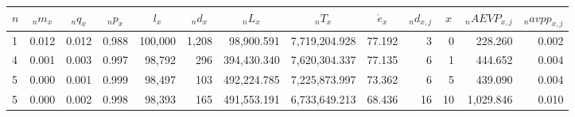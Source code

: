 \documentclass[fontsize=11pt]{article}
\begin{document}
\begin{landscape}
\begin{table}[]
\centering
\begin{tabular}{lrrrrrrrrrr|r|r|}
\hline
\multicolumn{1}{|l|}{$n$} & \multicolumn{1}{c|}{${}_nm_x$}   & \multicolumn{1}{c|}{${}_nq_x$}   & \multicolumn{1}{c|}{${}_{n}p_x$}   & \multicolumn{1}{c|}{$l_x$}      & \multicolumn{1}{c|}{${}_nd_x$}    & \multicolumn{1}{c|}{${}_nL_x$}         & \multicolumn{1}{c|}{${}_nT_x$}           & \multicolumn{1}{c|}{$\mathring{e}_x$}     & \multicolumn{1}{c|}{${}_nd_{x,j}$} & \multicolumn{1}{c|}{$x$} & \multicolumn{1}{c|}{${}_nAEVP_{x,j}$}             & \multicolumn{1}{c|}{${}_navpp_{x,j}$}      \\ \hline
\multicolumn{1}{|l|}{1} & \multicolumn{1}{r|}{0.012} & \multicolumn{1}{r|}{0.012} & \multicolumn{1}{r|}{0.988} & \multicolumn{1}{r|}{100,000} & \multicolumn{1}{r|}{1,208}  & \multicolumn{1}{r|}{98,900.591}  & \multicolumn{1}{r|}{7,719,204.928} & \multicolumn{1}{r|}{77.192} & \multicolumn{1}{r|}{3}     & 0                      & 228.260                                  & 0.002                               \\ \hline
\multicolumn{1}{|l|}{4} & \multicolumn{1}{r|}{0.001} & \multicolumn{1}{r|}{0.003} & \multicolumn{1}{r|}{0.997} & \multicolumn{1}{r|}{98,792}  & \multicolumn{1}{r|}{296}    & \multicolumn{1}{r|}{394,430.340} & \multicolumn{1}{r|}{7,620,304.337} & \multicolumn{1}{r|}{77.135} & \multicolumn{1}{r|}{6}     & 1                      & 444.652                                  & 0.004                               \\ \hline
\multicolumn{1}{|l|}{5} & \multicolumn{1}{r|}{0.000} & \multicolumn{1}{r|}{0.001} & \multicolumn{1}{r|}{0.999} & \multicolumn{1}{r|}{98,497}  & \multicolumn{1}{r|}{103}    & \multicolumn{1}{r|}{492,224.785} & \multicolumn{1}{r|}{7,225,873.997} & \multicolumn{1}{r|}{73.362} & \multicolumn{1}{r|}{6}     & 5                      & 439.090                                  & 0.004                               \\ \hline
\multicolumn{1}{|l|}{5} & \multicolumn{1}{r|}{0.000} & \multicolumn{1}{r|}{0.002} & \multicolumn{1}{r|}{0.998} & \multicolumn{1}{r|}{98,393}  & \multicolumn{1}{r|}{165}    & \multicolumn{1}{r|}{491,553.191} & \multicolumn{1}{r|}{6,733,649.213} & \multicolumn{1}{r|}{68.436} & \multicolumn{1}{r|}{16}    & 10                     & 1,029.846                                & 0.010                               \\ \hline

\end{tabular}
\end{table}
\end{landscape}
\end{document}
